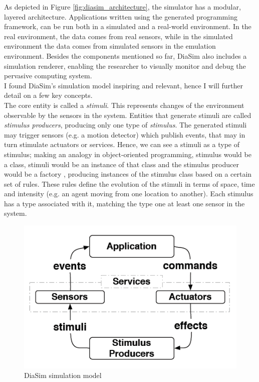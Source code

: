 As depicted in Figure \ref{fig:diasim_architecture}, the simulator has a modular, layered architecture. Applications written using the generated programming framework, can be run both in a simulated and a real-world environment. In the real environment, the data comes from real sensors, while in the simulated environment the data comes from simulated sensors in the emulation environment. Besides the components mentioned so far, DiaSim also includes a simulation renderer, enabling the researcher to visually monitor and debug the pervasive computing system.\\

I found DiaSim's simulation model inspiring and relevant, hence I will further detail on a few key concepts.\\

The core entity is called a \emph{stimuli}. This represents changes of the environment observable by the sensors in the system. Entities that generate stimuli are called \emph{stimulus producers}, producing only one type of \emph{stimulus}. The generated stimuli may trigger sensors (e.g. a motion detector) which publish events, that may in turn stimulate actuators or services. Hence, we can see a stimuli as a type of stimulus; making an analogy in object-oriented programming, stimulus would be a class, stimuli would be an instance of that class and the stimulus producer would be a factory \cite{gamma1994design}, producing instances of the stimulus class based on a certain set of rules. These rules define the evolution of the stimuli in terms of space, time and intensity (e.g. an agent moving from one location to another). Each stimulus has a type associated with it, matching the type one at least one sensor in the system.\\

\begin{figure}[H]
	\centering
	\includegraphics[width=\linewidth]{gfx/Chapter2/diasim_simulation_model}
	\caption{DiaSim simulation model}
	\label{fig:diasim_simulation_model}
\end{figure}

